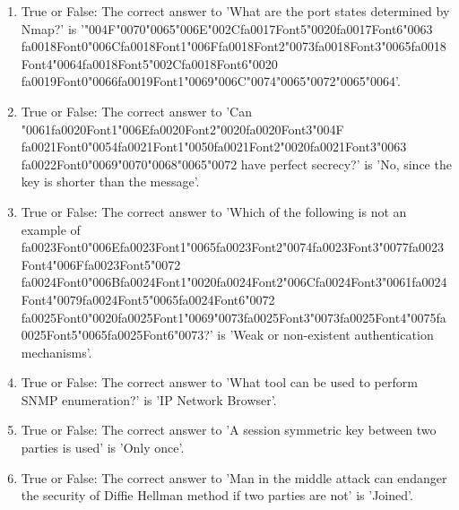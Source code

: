 \documentclass[12pt]{article}
\begin{document}
\begin{enumerate}[label=\arabic*.]
\item True or False: The correct answer to 'What are the port states determined by Nmap?' is '{\char"004F}{\char"0070}{\char"0065}{\char"006E}{\char"002C}{\csname fa0017Font5\endcsname\char"0020}{\csname fa0017Font6\endcsname\char"0063} {\csname fa0018Font0\endcsname\char"006C}{\csname fa0018Font1\endcsname\char"006F}{\csname fa0018Font2\endcsname\char"0073}{\csname fa0018Font3\endcsname\char"0065}{\csname fa0018Font4\endcsname\char"0064}{\csname fa0018Font5\endcsname\char"002C}{\csname fa0018Font6\endcsname\char"0020} {\csname fa0019Font0\endcsname\char"0066}{\csname fa0019Font1\endcsname\char"0069}{\char"006C}{\char"0074}{\char"0065}{\char"0072}{\char"0065}{\char"0064}'.
\item True or False: The correct answer to 'Can {\char"0061}{\csname fa0020Font1\endcsname\char"006E}{\csname fa0020Font2\endcsname\char"0020}{\csname fa0020Font3\endcsname\char"004F} {\csname fa0021Font0\endcsname\char"0054}{\csname fa0021Font1\endcsname\char"0050}{\csname fa0021Font2\endcsname\char"0020}{\csname fa0021Font3\endcsname\char"0063} {\csname fa0022Font0\endcsname\char"0069}{\char"0070}{\char"0068}{\char"0065}{\char"0072} have perfect secrecy?' is 'No, since the key is shorter than the message'.
\item True or False: The correct answer to 'Which of the following is not an example of {\csname fa0023Font0\endcsname\char"006E}{\csname fa0023Font1\endcsname\char"0065}{\csname fa0023Font2\endcsname\char"0074}{\csname fa0023Font3\endcsname\char"0077}{\csname fa0023Font4\endcsname\char"006F}{\csname fa0023Font5\endcsname\char"0072} {\csname fa0024Font0\endcsname\char"006B}{\csname fa0024Font1\endcsname\char"0020}{\csname fa0024Font2\endcsname\char"006C}{\csname fa0024Font3\endcsname\char"0061}{\csname fa0024Font4\endcsname\char"0079}{\csname fa0024Font5\endcsname\char"0065}{\csname fa0024Font6\endcsname\char"0072} {\csname fa0025Font0\endcsname\char"0020}{\csname fa0025Font1\endcsname\char"0069}{\char"0073}{\csname fa0025Font3\endcsname\char"0073}{\csname fa0025Font4\endcsname\char"0075}{\csname fa0025Font5\endcsname\char"0065}{\csname fa0025Font6\endcsname\char"0073}?' is 'Weak or non-existent authentication mechanisms'.
\item True or False: The correct answer to 'What tool can be used to perform SNMP enumeration?' is 'IP Network Browser'.
\item True or False: The correct answer to 'A session symmetric key between two parties is used' is 'Only once'.
\item True or False: The correct answer to 'Man in the middle attack can endanger the security of Diffie Hellman method if two parties are not' is 'Joined'.

\end{enumerate}
\end{document}
